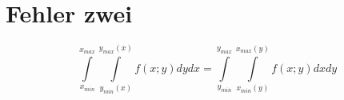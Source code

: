 \section{Fehler zwei}

\[
	 \boxed{\int\limits_{x_{min}}^{x_{max}}\int\limits_{y_{min}(x)}^{y_{max}(x)}f(x;y) dy dx =
  \int\limits_{y_{min}}^{y_{max}}\int\limits_{x_{min}(y)}^{x_{max}(y)}f(x;y) dx dy}
\]
